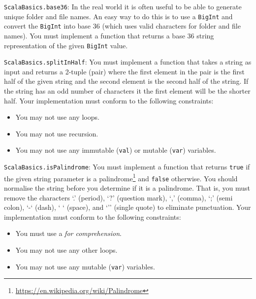 \documentclass[12pt,a4paper]{exam}
\begin{document}
\begin{questions}
\question
\verb!ScalaBasics.base36!: In the real world it is often useful to be able to generate unique folder 
and file names. An easy way to do this is to use a \verb!BigInt! and convert the \verb!BigInt! 
into base 36 (which uses valid characters for folder and file names). 
You must implement a function that returns a base 36 string representation of the given \verb!BigInt! value.

\question
\verb!ScalaBasics.splitInHalf!: 
You must implement a function that takes a string as input and returns a 2-tuple (pair) where the first element 
in the pair is the first half of the given string and the second element is the second half of the string. 
If the string has an odd number of characters it the first element will be the shorter half. 
Your implementation must conform to the following constraints:
\begin{itemize}
	\item You may not use any loops.
	\item You may not use recursion.
	\item You may not use any immutable (\verb!val!) or mutable (\verb!var!) variables.
\end{itemize}

\question
\verb!ScalaBasics.isPalindrome!: You must implement a function that returns \verb!true! if the 
given string parameter is a palindrome\footnote{\url{https://en.wikipedia.org/wiki/Palindrome}} 
and \verb!false! otherwise. You should normalise 
the string before you determine if it is a palindrome. That is, you must remove the characters `.’ (period),
`?’ (question mark), `,’ (comma), `;’ (semi colon), `-‘ (dash), ` ‘ (space), and `’’ (single quote) 
to eliminate punctuation. Your implementation must conform to the following constraints:
\begin{itemize}
	\item You must use a \emph{for comprehension}.
	\item You may not use any other loops.
	\item You may not use any mutable (\verb!var!) variables.
\end{itemize}

\end{questions}
\end{document}
